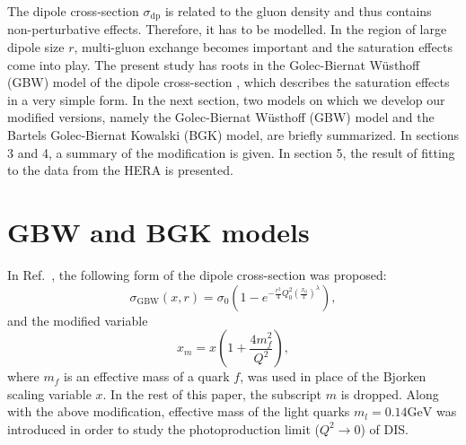 \documentclass[11pt]{article}
\begin{document}
 The dipole cross-section $\sigma_{\mathrm{dp}}$ is related to the gluon density and thus contains non-perturbative effects. Therefore, it has to be modelled. In the region of large dipole size $r$, multi-gluon exchange becomes important and the saturation effects come into play. The present study has roots in the Golec-Biernat W\"usthoff (GBW) model of the dipole cross-section \cite{gbw1998}, which describes the saturation effects in a very simple form.
In the next section, two models on which we develop our modified versions, namely the Golec-Biernat W\"usthoff (GBW) model\cite{gbw1998} and the Bartels Golec-Biernat Kowalski (BGK) model\cite{bgk2002}, are briefly summarized.  In sections 3 and 4, a summary of the modification is given. In section 5, the result of fitting to the data from the HERA\cite{hera} is presented. %
 
\section{GBW and BGK models }
In Ref.~\cite{gbw1998}, the following form of the dipole cross-section was proposed:
\begin{equation}
\sigma_{\mathrm{GBW}}(x ,r )=\sigma_{0} \left(1-e^{-\frac{r^2}{4} Q_0^2\left(\frac{x_0}{x}\right)^{\lambda} }\right),
\label{eq:gbw}
\end{equation}
and the modified variable 
\begin{equation}
x_m=x \left(1+\frac{4 m_f^2}{Q^2}\right),
\label{eq:modx}
\end{equation}
where $m_f$ is an effective mass of a quark $f$,
was used in place of the Bjorken scaling variable $x$. In the rest of this paper, the subscript $m$ is dropped. Along with the above modification, effective mass of the light quarks $m_l=0.14\mathrm{GeV}$ was introduced in order to study the photoproduction limit ($Q^2\rightarrow0$) of DIS. 
\end{document}
